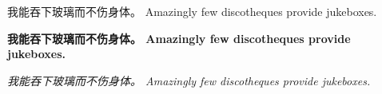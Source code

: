 \documentclass{article}
\begin{document}
我能吞下玻璃而不伤身体。 Amazingly few discotheques provide jukeboxes.\par
\textbf{ 我能吞下玻璃而不伤身体。 Amazingly few discotheques provide jukeboxes.}\par
\textit{ 我能吞下玻璃而不伤身体。 Amazingly few discotheques provide jukeboxes.}
\end{document}
